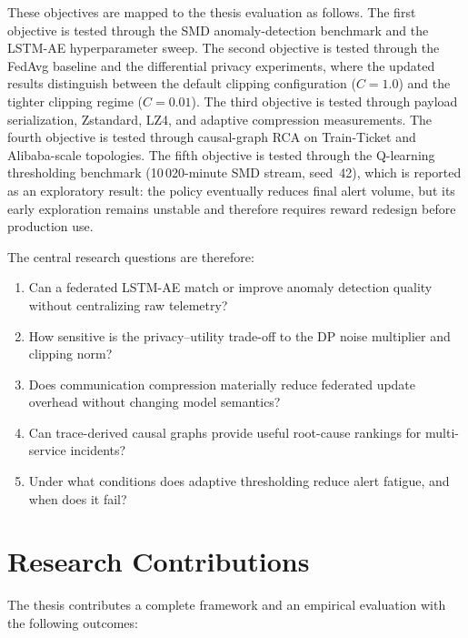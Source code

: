 These objectives are mapped to the thesis evaluation as follows. The first
objective is tested through the SMD anomaly-detection benchmark and the
LSTM-AE hyperparameter sweep. The second objective is tested through the
FedAvg baseline and the differential privacy experiments, where the updated
results distinguish between the default clipping configuration
($C=1.0$) and the tighter clipping regime ($C=0.01$). The third objective is
tested through payload serialization, Zstandard, LZ4, and adaptive compression
measurements. The fourth objective is tested through causal-graph RCA on
Train-Ticket and Alibaba-scale topologies. The fifth objective is tested
    through the Q-learning thresholding benchmark (10\,020-minute SMD stream,
    seed~42), which is reported as an exploratory result: the policy eventually
    reduces final alert volume, but its early exploration remains unstable and
    therefore requires reward redesign before production use.

The central research questions are therefore:

\begin{enumerate}
    \item Can a federated LSTM-AE match or improve anomaly detection quality
    without centralizing raw telemetry?
    \item How sensitive is the privacy--utility trade-off to the DP noise
    multiplier and clipping norm?
    \item Does communication compression materially reduce federated update
    overhead without changing model semantics?
    \item Can trace-derived causal graphs provide useful root-cause rankings
    for multi-service incidents?
    \item Under what conditions does adaptive thresholding reduce alert fatigue,
    and when does it fail?
\end{enumerate}

\section{Research Contributions}
\label{sec:contributions}

The thesis contributes a complete framework and an empirical evaluation with the
following outcomes:

